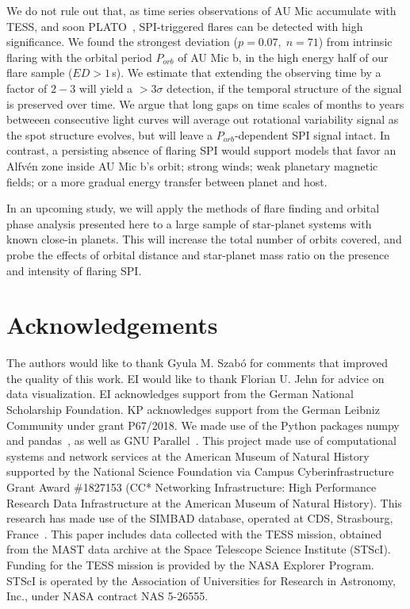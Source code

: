 \documentclass[fleqn,usenatbib]{mnras}%
\begin{document}
We do not rule out that, as time series observations of AU Mic accumulate with TESS, and soon PLATO~\citep{rauer2014plato}, SPI-triggered flares can be detected with high significance. We found the strongest deviation \mbox{($p=0.07,\;n=71$)} from intrinsic flaring with the orbital period $P_{orb}$ of AU Mic b, in the high energy half of our flare sample ($ED>1$\,s). We estimate that extending the observing time by a factor of $2-3$ will yield a $>3\sigma$ detection, if the temporal structure of the signal is preserved over time. We argue that long gaps on time scales of months to years betweeen consecutive light curves will average out rotational variability signal as the spot structure evolves, but will leave a $P_{orb}$-dependent SPI signal intact. In contrast, a persisting absence of flaring SPI would support models that favor an Alfv\'en zone inside AU Mic b's orbit; strong winds; weak planetary magnetic fields; or a more gradual energy transfer between planet and host.

In an upcoming study, we will apply the methods of flare finding and orbital phase analysis presented here to a large sample of star-planet systems with known close-in planets. This will increase the total number of orbits covered, and probe the effects of orbital distance and star-planet mass ratio on the presence and intensity of flaring SPI.
\section*{Acknowledgements}
The authors would like to thank Gyula M. Szab\'o for comments that improved the quality of this work. 
EI would like to thank Florian U. Jehn for advice on data visualization. EI acknowledges support from the German National Scholarship Foundation. KP acknowledges support from the German Leibniz Community under grant P67/2018. We made use of the Python packages numpy~\citep{numpy2020} and pandas~\citep{pandas2010,pandas2020software}, as well as GNU Parallel~\citep{tange2018gnu}. This project made use of computational systems and network services at the American Museum of Natural History supported by the National Science Foundation via Campus Cyberinfrastructure Grant Award \#1827153 (CC* Networking Infrastructure: High Performance Research Data Infrastructure at the American Museum of Natural History). This research has made use of the SIMBAD database, operated at CDS, Strasbourg, France~\citep{wenger2000}. This paper includes data collected with the TESS mission, obtained from the MAST data archive at the Space Telescope Science Institute (STScI). Funding for the TESS mission is provided by the NASA Explorer Program. STScI is operated by the Association of Universities for Research in Astronomy, Inc., under NASA contract NAS 5-26555.
\end{document}
